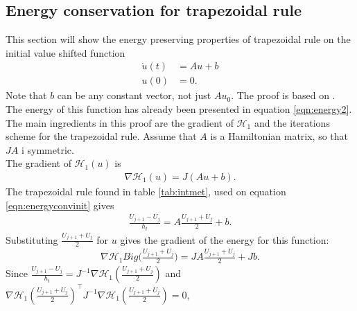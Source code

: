 \subsection{Energy conservation for trapezoidal rule} %
This section will show the energy preserving properties of trapezoidal rule on the initial value shifted function
\begin{equation}
\begin{aligned}
\dot{u}(t)& = Au + b \\
u(0)& = 0.
\end{aligned}
\label{eqn:energyconvinit}
\end{equation}
\noindent Note that $b$ can be any constant vector, not just $A u_0$. The proof is based on \cite{convtrap}.
The energy of this function has already been presented in equation \eqref{eqn:energy2}. The main ingredients in this proof are the gradient of $\mathcal{H}_1$ and the iterations scheme for the trapezoidal rule. Assume that $A$ is a Hamiltonian matrix, so that $JA$ i symmetric.\\ 
The gradient of $\mathcal{H}_1(u)$ is 
\begin{equation*}
\begin{aligned}
\nabla \mathcal{H}_1(u) = J (Au + b) .
\end{aligned}
\end{equation*}
\noindent The trapezoidal rule found in table \ref{tab:intmet}, used on equation \eqref{eqn:energyconvinit} gives 
\begin{equation*}
\begin{aligned}
\frac{U_{j+1} - U_j}{h_t} = A \frac{U_{j+1}  + U_j}{2} + b.
\end{aligned}
\end{equation*}
\noindent Substituting $\frac{U_{j+1}  + U_j}{2} $ for $u$ gives the gradient of the energy for this function:
\begin{equation*}
\begin{aligned}
\nabla \mathcal{H}_1 Big(\frac{U_{j+1}  + U_j}{2}\Big) = JA \frac{U_{j+1}  + U_j}{2} + J b.
\end{aligned}
\end{equation*}
\noindent Since
$\frac{ U_{j+1} - U_j}{h_t} = J^{-1} \nabla \mathcal{H}_1( \frac{U_{j+1}  + U_j}{2} ) $
\noindent and
$\nabla \mathcal{H}_1(\frac{U_{j+1}  + U_j}{2})^\top J^{-1} \nabla \mathcal{H}_1(\frac{U_{j+1}  + U_j}{2}) = 0$,
